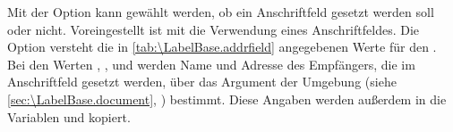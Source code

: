 \begin{Declaration}
\end{Declaration}%
%
Mit der Option  kann gewählt werden, ob ein Anschriftfeld
gesetzt werden soll oder nicht. Voreingestellt ist
mit  die Verwendung eines Anschriftfeldes.  Die Option versteht
die in \autoref{tab:\LabelBase.addrfield}
angegebenen Werte für den .  Bei den Werten ,
,  und  werden Name
und Adresse des Empfängers, die im Anschriftfeld gesetzt werden, über das
Argument der Umgebung  (siehe
\autoref{sec:\LabelBase.document}, )
bestimmt. Diese Angaben werden außerdem in die Variablen  und
 kopiert.


